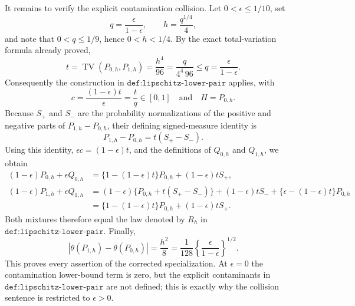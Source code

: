 It remains to verify the explicit contamination collision.  Let \(0<\epsilon\leq1/10\), set
\[
 q=\frac{\epsilon}{1-\epsilon},
 \qquad
 h=\frac{q^{1/4}}4,
\]
and note that \(0<q\leq1/9\), hence \(0<h<1/4\).  By the exact total-variation formula already proved,
\[
 t=\operatorname{TV}(P_{0,h},P_{1,h})
 =\frac{h^4}{96}
 =\frac{q}{4^4\,96}
 \leq q=\frac{\epsilon}{1-\epsilon}.
\]
Consequently the construction in \(\texttt{def:lipschitz-lower-pair}\) applies, with
\[
 c=\frac{(1-\epsilon)t}{\epsilon}=\frac tq\in[0,1]
 \quad\text{and}\quad H=P_{0,h}.
\]
Because \(S_+\) and \(S_-\) are the probability normalizations of the positive and negative parts of \(P_{1,h}-P_{0,h}\), their defining signed-measure identity is
\[
 P_{1,h}-P_{0,h}=t(S_+-S_-).
\]
Using this identity, \(\epsilon c=(1-\epsilon)t\), and the definitions of \(Q_{0,h}\) and \(Q_{1,h}\), we obtain
\[
\begin{aligned}
 (1-\epsilon)P_{0,h}+\epsilon Q_{0,h}
 &=\{1-(1-\epsilon)t\}P_{0,h}+(1-\epsilon)tS_+,\\
 (1-\epsilon)P_{1,h}+\epsilon Q_{1,h}
 &= (1-\epsilon)\{P_{0,h}+t(S_+-S_-)\}
    +(1-\epsilon)tS_-+\{\epsilon-(1-\epsilon)t\}P_{0,h}\\
 &=\{1-(1-\epsilon)t\}P_{0,h}+(1-\epsilon)tS_+.
\end{aligned}
\]
Both mixtures therefore equal the law denoted by \(R_h\) in \(\texttt{def:lipschitz-lower-pair}\).  Finally,
\[
 \left|\theta(P_{1,h})-\theta(P_{0,h})\right|
 =\frac{h^2}{8}
 =\frac1{128}\left\{\frac{\epsilon}{1-\epsilon}\right\}^{1/2}.
\]
This proves every assertion of the corrected specialization.  At \(\epsilon=0\) the contamination lower-bound term is zero, but the explicit contaminants in \(\texttt{def:lipschitz-lower-pair}\) are not defined; this is exactly why the collision sentence is restricted to \(\epsilon>0\).
